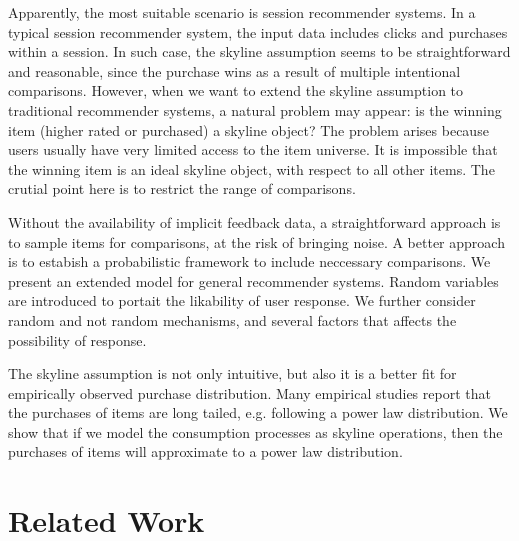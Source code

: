 \documentclass[sigconf]{acmart}
\begin{document}
Apparently, the most suitable scenario is session recommender systems. In a typical session recommender system, the input data includes clicks and purchases within a session. In such case, the skyline assumption seems to be straightforward and reasonable, since the purchase wins as a result of multiple intentional comparisons. However, when we want to extend the skyline assumption to traditional recommender systems, a natural problem may appear: is the winning item (higher rated or purchased) a skyline object? The problem arises because users usually have very limited access to the item universe. It is impossible that the winning item is an ideal skyline object, with respect to all other items. The crutial point here is to restrict the range of comparisons. 

Without the availability of implicit feedback data, a straightforward approach is to sample items for comparisons, at the risk of bringing noise. A better approach is to estabish a probabilistic framework to include neccessary comparisons. We present an extended model for general recommender systems. Random variables are introduced to portait the likability of user response. We further consider random and not random mechanisms, and several factors that affects the possibility of response.       

The skyline assumption is not only intuitive, but also it is a better fit for empirically observed purchase distribution. Many empirical studies report that the purchases of items are long tailed, e.g. following a power law distribution. We show that if we model the consumption processes as skyline operations, then the purchases of items will approximate to a power law distribution. 

\section{Related Work}
\end{document}
